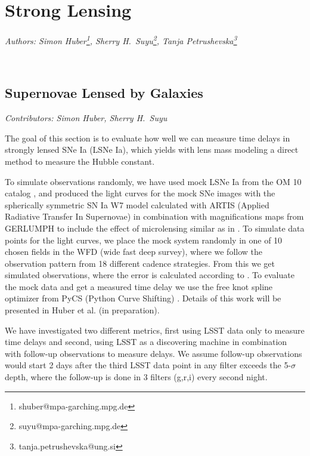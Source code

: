 

\clearpage

\section{Strong Lensing}
\textit{Authors: Simon Huber\footnote{shuber@mpa-garching.mpg.de}, Sherry H.~Suyu\footnote{suyu@mpa-garching.mpg.de}, Tanja Petrushevska\footnote{tanja.petrushevska@ung.si} }

\

\subsection{Supernovae Lensed by Galaxies}
\textit{Contributors: Simon Huber, Sherry H.~Suyu}

The goal of this section is to evaluate how well we can measure time delays in strongly lensed SNe Ia (LSNe Ia), which yields with lens mass modeling a direct method to measure the Hubble constant. 
 
To simulate observations randomly, we have used
mock LSNe Ia from the OM 10 catalog \citep{Oguri:2010},
and produced the light curves for the mock SNe images with
the spherically symmetric SN Ia W7 model \citep{1984:Nomoto}
calculated with ARTIS (Applied Radiative Transfer In Supernovae)
\citep{Kromer:2009ce} in combination with magnifications maps from
GERLUMPH \citep{Vernardos:2015wta} to include the effect of
microlensing similar as in \citep{Goldstein:2017bny}. To simulate
data points for the light curves,  we place the mock system randomly in one of 10 chosen
fields in the WFD (wide fast deep survey), where we follow the observation pattern from 18 different cadence strategies.
From this we get simulated observations, where the error is calculated according to \cite[sec 3.5,
p. 67]{2009:LSSTscience}.
To evaluate the mock data and get a measured time delay we use the
free knot spline optimizer from PyCS (Python Curve Shifting)
\citep{2013:Tewesb,Bonvin:2015jia}. Details of this
work will be presented in Huber et al. (in preparation).

We have investigated two different metrics, first using LSST data only to measure time delays and second, using LSST as a discovering machine in combination with follow-up observations to measure delays. We assume follow-up observations would start 2 days after the third LSST data point in any filter exceeds the 5-$\sigma$ depth, where the follow-up is done in 3 filters (g,r,i) every second night. 

